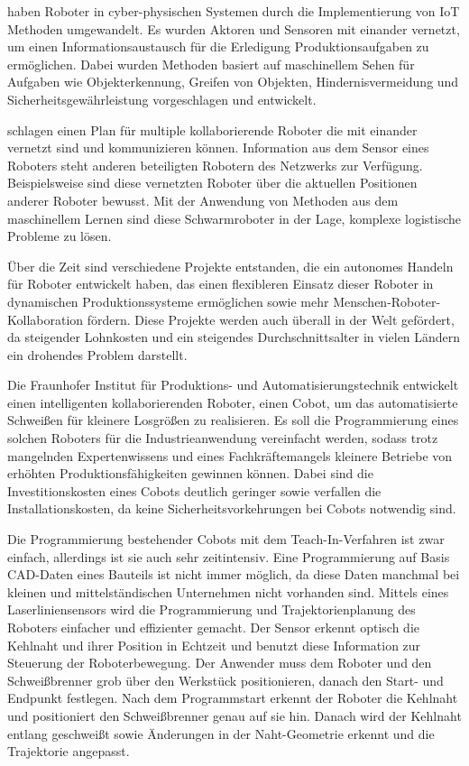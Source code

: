 \textcite{Luo2016} haben Roboter in cyber-physischen Systemen durch die Implementierung von IoT Methoden umgewandelt. Es wurden Aktoren und Sensoren mit einander vernetzt, um einen Informationsaustausch für die Erledigung Produktionsaufgaben zu ermöglichen. Dabei wurden Methoden basiert auf maschinellem Sehen für Aufgaben wie Objekterkennung, Greifen von Objekten, Hindernisvermeidung und Sicherheitsgewährleistung vorgeschlagen und entwickelt. 

\textcite{Wang2012} schlagen einen Plan für multiple kollaborierende Roboter die mit einander vernetzt sind und kommunizieren können. Information aus dem Sensor eines Roboters steht anderen beteiligten Robotern des Netzwerks zur Verfügung. Beispielsweise sind diese vernetzten Roboter über die aktuellen Positionen anderer Roboter bewusst. Mit der Anwendung von Methoden aus dem maschinellem Lernen sind diese Schwarmroboter in der Lage, komplexe logistische Probleme zu lösen.

Über die Zeit sind verschiedene Projekte entstanden, die ein autonomes Handeln für Roboter entwickelt haben, das einen flexibleren Einsatz dieser Roboter in dynamischen Produktionssysteme ermöglichen sowie mehr Menschen-Roboter-Kollaboration fördern. Diese Projekte werden auch überall in der Welt gefördert, da steigender Lohnkosten und ein steigendes Durchschnittsalter in vielen Ländern ein drohendes Problem darstellt. \autocite{Wang2018} \autocite{Marguglio2022}

Die Fraunhofer Institut für Produktions- und Automatisierungstechnik entwickelt einen intelligenten kollaborierenden Roboter, einen Cobot, um das automatisierte Schweißen für kleinere Losgrößen zu realisieren. Es soll die Programmierung eines solchen Roboters für die Industrieanwendung vereinfacht werden, sodass trotz mangelnden Expertenwissens und eines Fachkräftemangels kleinere Betriebe von erhöhten Produktionsfähigkeiten gewinnen können. Dabei sind die Investitionskosten eines Cobots deutlich geringer sowie verfallen die Installationskosten, da keine Sicherheitsvorkehrungen bei Cobots notwendig sind. \autocite{automationspraxis_2021} 

Die Programmierung bestehender Cobots mit dem Teach-In-Verfahren ist zwar einfach, allerdings ist sie auch sehr zeitintensiv. Eine Programmierung auf Basis CAD-Daten eines Bauteils ist nicht immer möglich, da diese Daten manchmal bei kleinen und mittelständischen Unternehmen nicht vorhanden sind. Mittels eines Laserliniensensors wird die Programmierung und Trajektorienplanung des Roboters einfacher und effizienter gemacht. Der Sensor erkennt optisch die Kehlnaht und ihrer Position in Echtzeit und benutzt diese Information zur Steuerung der Roboterbewegung. Der Anwender muss dem Roboter und den Schweißbrenner grob über den Werkstück positionieren, danach den Start- und Endpunkt festlegen. Nach dem Programmstart erkennt der Roboter die Kehlnaht und positioniert den Schweißbrenner genau auf sie hin. Danach wird der Kehlnaht entlang geschweißt sowie Änderungen in der Naht-Geometrie erkennt und die Trajektorie angepasst. \autocite{automationspraxis_2021}

